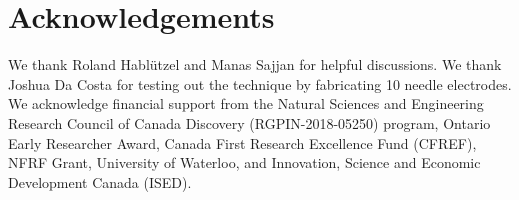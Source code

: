 \documentclass[%
 aip,
 amsmath,amssymb,
 reprint,%
]{revtex4-1}
\begin{document}
\section{Acknowledgements}
We thank Roland Hablützel and Manas Sajjan for helpful discussions. We thank Joshua Da Costa for testing out the technique by fabricating 10 needle electrodes.
We acknowledge financial support from the Natural Sciences and Engineering Research Council of Canada Discovery (RGPIN-2018-05250) program, Ontario Early Researcher Award, Canada First Research Excellence Fund (CFREF), NFRF Grant, University of Waterloo, and Innovation, Science and Economic Development Canada (ISED).



\nocite{*}
\end{document}
